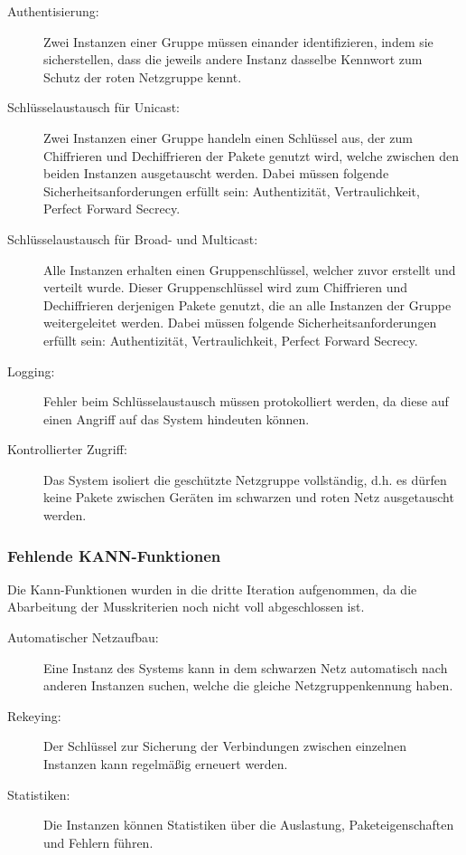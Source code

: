 \documentclass[a4paper, 11pt, ngerman, fleqn]{article}
\begin{document}
\begin{description}

\item[Authentisierung:] Zwei Instanzen einer Gruppe müssen einander identifizieren, indem sie sicherstellen, dass die jeweils andere Instanz dasselbe Kennwort zum Schutz der roten Netzgruppe kennt.

\item[Schlüsselaustausch für Unicast:] Zwei Instanzen einer Gruppe handeln einen Schlüssel aus, der zum Chiffrieren und Dechiffrieren der Pakete genutzt wird, welche zwischen den beiden Instanzen ausgetauscht werden. 
Dabei müssen folgende Sicherheitsanforderungen erfüllt sein: Authentizität, Vertraulichkeit, Perfect Forward Secrecy.

\item[Schlüsselaustausch für Broad- und Multicast:] Alle Instanzen erhalten einen Gruppenschlüssel, welcher zuvor erstellt und verteilt wurde. 
Dieser Gruppenschlüssel wird zum Chiffrieren und Dechiffrieren derjenigen Pakete genutzt, die an alle Instanzen der Gruppe weitergeleitet werden.
Dabei müssen folgende Sicherheitsanforderungen erfüllt sein:
Authentizität, Vertraulichkeit, Perfect Forward Secrecy.

\item[Logging:] Fehler beim Schlüsselaustausch müssen protokolliert werden, da diese auf
einen Angriff auf das System hindeuten können.

\item[Kontrollierter Zugriff:] Das System isoliert die geschützte Netzgruppe vollständig, d.h.
es dürfen keine Pakete zwischen Geräten im schwarzen und roten Netz ausgetauscht
werden.
\end{description}  

\subsubsection{Fehlende KANN-Funktionen}
Die Kann-Funktionen wurden in die dritte Iteration aufgenommen, da die Abarbeitung der Musskriterien noch nicht voll abgeschlossen ist. 

\begin{description}

\item[Automatischer Netzaufbau:] Eine Instanz des Systems kann in dem schwarzen Netz
automatisch nach anderen Instanzen suchen, welche die gleiche Netzgruppenkennung
haben.

\item[Rekeying:] Der Schlüssel zur Sicherung der Verbindungen zwischen einzelnen Instanzen kann regelmäßig erneuert werden.

\item[Statistiken:] Die Instanzen können Statistiken über die Auslastung, Paketeigenschaften und Fehlern führen.
\end{description}
\end{document}

